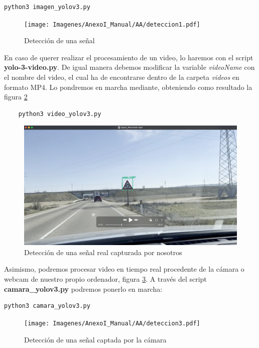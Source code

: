 \begin{lstlisting}
python3 imagen_yolov3.py
\end{lstlisting}

\begin{figure}[H]
	\centering
	\texttt{[image: Imagenes/AnexoI\_Manual/AA/deteccion1.pdf]}
	\caption{Detección de una señal}
	\label{detecc1}
\end{figure}

En caso de querer realizar el procesamiento de un video, lo haremos con el script \textbf{yolo-3-video.py}. De igual manera debemos modificar la variable \textit{videoName} con el nombre del video, el cual ha de encontrarse dentro de la carpeta \textit{videos} en formato MP4. Lo pondremos en marcha mediante, obteniendo como resultado la figura \ref{detecc2}
\begin{lstlisting}
	python3 video_yolov3.py
\end{lstlisting}
	
\begin{figure}[H]
	\centering
	\includegraphics[width=\textwidth]{Imagenes/AnexoI_Manual/AA/deteccion2.pdf}
	\caption{Detección de una señal real capturada por nosotros}
	\label{detecc2}
\end{figure}

Asimismo, podremos procesar video en tiempo real procedente de la cámara o webcam de nuestro propio ordenador, figura \ref{detecc3}. A través del script \textbf{camara_yolov3.py} podremos ponerlo en marcha:

\begin{lstlisting}
python3 camara_yolov3.py
\end{lstlisting}

\begin{figure}[H]
	\centering
	\texttt{[image: Imagenes/AnexoI\_Manual/AA/deteccion3.pdf]}
	\caption{Detección de una señal captada por la cámara}
	\label{detecc3}
\end{figure}

